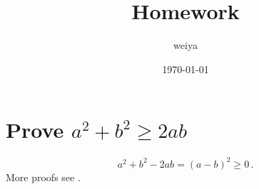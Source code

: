 \documentclass[12pt]{article}
\title{Homework}
\author{weiya}
\date{\today}
\begin{document}
\maketitle
\pagestyle{fancy}
\lhead{}
\rhead{}

\section{Prove $a^2 + b^2 \ge 2ab$}

\begin{solution}
  $$
  a^2 + b^2 - 2ab = (a - b)^2 \ge 0\,.
  $$
  More proofs see \textcite{kkkWhy2ab2017}.
\end{solution}

\printbibliography
\end{document}
